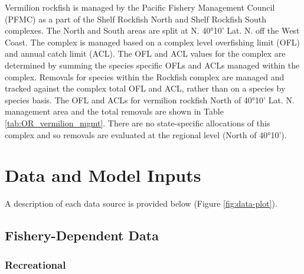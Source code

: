 \documentclass[11pt,
  english,
  a4paper,
]{article}
\begin{document}
\leavevmode\tagmcend\tagstructend


Vermilion rockfish is managed by the Pacific Fishery Management Council (PFMC) as a part of the Shelf Rockfish North and Shelf Rockfish South complexes. The North and South areas are split at N. 40°10' Lat. N. off the West Coast. The complex is managed based on a complex level overfishing limit (OFL) and annual catch limit (ACL). The OFL and ACL values for the complex are determined by summing the species specific OFLs and ACLs managed within the complex. Removals for species within the Rockfish complex are managed and tracked against the complex total OFL and ACL, rather than on a species by species basis. The OFL and ACLs for vermilion rockfish North of 40°10' Lat. N. management area and the total removals are shown in Table \ref{tab:OR_vermilion_mgmt}. There are no state-specific allocations of this complex and so removals are evaluated at the regional level (North of 40°10').

\leavevmode\tagmcend\tagstructend\par


\hypertarget{data-and-model-inputs}{%
\section{Data and Model Inputs}\label{data-and-model-inputs}}

\leavevmode\tagmcend\tagstructend


A description of each data source is provided below (Figure \ref{fig:data-plot}).

\leavevmode\tagmcend\tagstructend\par


\hypertarget{fishery-dependent-data}{%
\subsection{Fishery-Dependent Data}\label{fishery-dependent-data}}

\leavevmode\tagmcend\tagstructend


\hypertarget{recreational}{%
\subsubsection{Recreational}\label{recreational}}
\end{document}
